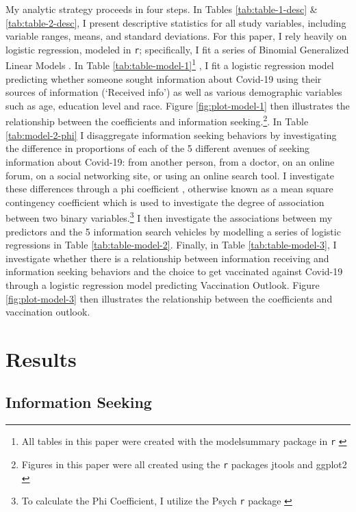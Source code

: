My analytic strategy proceeds in four steps. In Tables \ref{tab:table-1-desc}
\& \ref{tab:table-2-desc}, I present descriptive statistics for all study
variables, including variable ranges, means, and standard deviations. For this
paper, I rely heavily on logistic regression, modeled in \texttt{r}; specifically, I
fit a series of Binomial Generalized Linear Models \citep{venables2002a}. In Table \ref{tab:table-model-1}\footnote{All tables in this paper were created with the modelsummary package in \texttt{r} \citep{modelsummary}}
, I fit a logistic regression model predicting
whether someone sought information about Covid-19 using their sources of
information (`Received info') as well as various demographic variables such as
age, education level and race. Figure \ref{fig:plot-model-1} then illustrates
the relationship between the coefficients and information seeking.\footnote{Figures in this paper were all created using the \texttt{r} packages jtools \citep{jtools} and ggplot2 \citep{wickham_etal, wickham11}}.
In Table \ref{tab:model-2-phi} I disaggregate information seeking behaviors by
investigating the difference in proportions of each of the 5 different avenues
of seeking information about Covid-19: from another person, from a doctor, on an
online forum, on a social networking site, or using an online search tool. I
investigate these differences through a phi coefficient \citep{warrens08}, otherwise
known as a mean square contingency coefficient which is used to investigate the
degree of association between two binary variables.\footnote{To calculate the Phi
  Coefficient, I utilize the Psych \texttt{r} package \citep{psych}} I then investigate the
associations between my predictors and the 5 information search vehicles by
modelling a series of logistic regressions in Table \ref{tab:table-model-2}.
Finally, in Table \ref{tab:table-model-3}, I investigate whether there is a
relationship between information receiving and information seeking behaviors and
the choice to get vaccinated against Covid-19 through a logistic regression
model predicting Vaccination Outlook. Figure \ref{fig:plot-model-3} then
illustrates the relationship between the coefficients and vaccination outlook.

\hypertarget{results}{%
\section{Results}\label{results}}

\hypertarget{information-seeking}{%
\subsection{Information Seeking}\label{information-seeking}}

